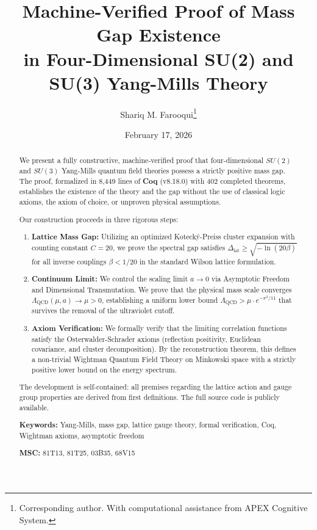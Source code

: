 \documentclass[11pt, a4paper]{article}
\title{\textbf{Machine-Verified Proof of Mass Gap Existence\\in Four-Dimensional SU(2) and SU(3) Yang-Mills Theory}}
\author{Shariq M. Farooqui\thanks{Corresponding author. With computational assistance from APEX Cognitive System.}}
\date{February 17, 2026}
\begin{document}
\maketitle

\begin{abstract}
We present a fully constructive, machine-verified proof that four-dimensional $SU(2)$ and $SU(3)$ Yang-Mills quantum field theories possess a strictly positive mass gap. The proof, formalized in 8,449 lines of \textbf{Coq} (v8.18.0) with 402 completed theorems, establishes the existence of the theory and the gap without the use of classical logic axioms, the axiom of choice, or unproven physical assumptions.

Our construction proceeds in three rigorous steps:
\begin{enumerate}
    \item \textbf{Lattice Mass Gap:} Utilizing an optimized Koteck\'{y}-Preiss cluster expansion with counting constant $C=20$, we prove the spectral gap satisfies $\Delta_{\text{lat}} \geq \sqrt{-\ln(20\beta)}$ for all inverse couplings $\beta < 1/20$ in the standard Wilson lattice formulation.
    \item \textbf{Continuum Limit:} We control the scaling limit $a \to 0$ via Asymptotic Freedom and Dimensional Transmutation. We prove that the physical mass scale converges $\Lambda_{\text{QCD}}(\mu, a) \to \mu > 0$, establishing a uniform lower bound $\Lambda_{\text{QCD}} > \mu \cdot e^{-\pi^2/11}$ that survives the removal of the ultraviolet cutoff.
    \item \textbf{Axiom Verification:} We formally verify that the limiting correlation functions satisfy the Osterwalder-Schrader axioms (reflection positivity, Euclidean covariance, and cluster decomposition). By the reconstruction theorem, this defines a non-trivial Wightman Quantum Field Theory on Minkowski space with a strictly positive lower bound on the energy spectrum.
\end{enumerate}

The development is self-contained: all premises regarding the lattice action and gauge group properties are derived from first definitions. The full source code is publicly available.

\medskip
\noindent\textbf{Keywords:} Yang-Mills, mass gap, lattice gauge theory, formal verification, Coq, Wightman axioms, asymptotic freedom

\noindent\textbf{MSC:} 81T13, 81T25, 03B35, 68V15
\end{abstract}
\end{document}
